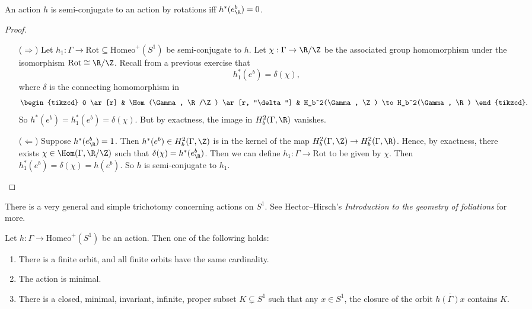 \documentclass[a4paper]{article}
\newcommand\Homeo{\mathrm{Homeo}}
\newcommand\Rot{\mathrm{Rot}}
\begin{document}
\begin{cor}
  An action $h$ is semi-conjugate to an action by rotations iff $h^*(e_\R^b) = 0$.
\end{cor}

\begin{proof}\leavevmode
  \begin{itemize}
    \item[($\Rightarrow$)] Let $h_1: \Gamma \to \Rot \subseteq \Homeo^+(S^1)$ be semi-conjugate to $h$. Let $\chi: \Gamma \to \R/\Z$ be the associated group homomorphism under the isomorphism $\Rot \cong \R/\Z$. Recall from a previous exercise that
      \[
        h_1^*(e^b) = \delta(\chi),
      \]
      where $\delta$ is the connecting homomorphism in
      \[
        \begin{tikzcd}
          0 \ar[r] & \Hom(\Gamma, \R/\Z) \ar[r, "\delta"] & H_b^2(\Gamma, \Z) \to H_b^2(\Gamma, \R)
        \end{tikzcd}.
      \]
      So $h^*(e^b) = h_1^*(e^b) = \delta(\chi)$. But by exactness, the image in $H_b^2(\Gamma, \R)$ vanishes.

    \item[($\Leftarrow$)] Suppose $h^*(e_\R^b) = 1$. Then $h^*(e^b) \in H_b^2(\Gamma, \Z)$ is in the kernel of the map $H^2_b(\Gamma, \Z) \to H^2_b(\Gamma, \R)$. Hence, by exactness, there exists $\chi \in \Hom(\Gamma, \R/\Z)$ such that $\delta(\chi) = h^*(e^b_\R)$. Then we can define $h_1: \Gamma \to \Rot$ to be given by $\chi$. Then $h_1^*(e^b) = \delta(\chi) = h(e^b)$. So $h$ is semi-conjugate to $h_1$.
  \end{itemize}
\end{proof}

There is a very general and simple trichotomy concerning actions on $S^1$. See Hector--Hirsch's \emph{Introduction to the geometry of foliations} for more.

\begin{thm}
  Let $h: \Gamma \to \Homeo^+(S^1)$ be an action. Then one of the following holds:
  \begin{enumerate}
    \item There is a finite orbit, and all finite orbits have the same cardinality.
    \item The action is minimal.
    \item There is a closed, minimal, invariant, infinite, proper subset $K \subsetneq S^1$ such that any $x \in S^1$, the closure of the orbit $\overline{h(\Gamma) x}$ contains $K$.
  \end{enumerate}
\end{thm}
\end{document}

